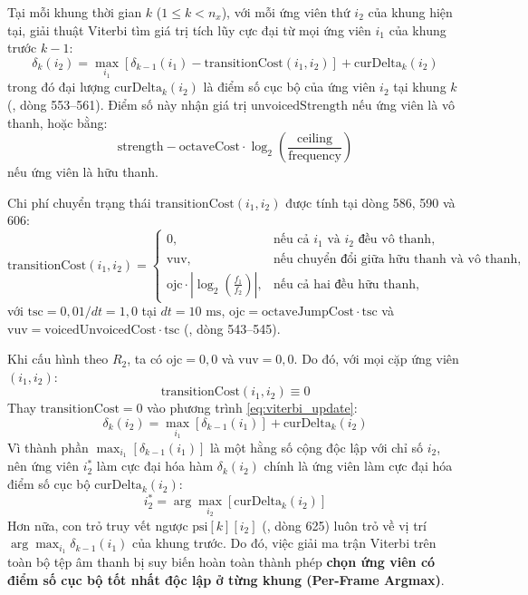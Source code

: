 Tại mỗi khung thời gian $k$ ($1 \le k < n_x$), với mỗi ứng viên thứ $i_2$ của khung hiện tại, giải thuật Viterbi tìm giá trị tích lũy cực đại từ mọi ứng viên $i_1$ của khung trước $k-1$:
\begin{equation}
    \delta_k(i_2) = \max_{i_1} \left[ \delta_{k-1}(i_1) - \text{transitionCost}(i_1, i_2) \right] + \text{curDelta}_k(i_2)
    \label{eq:viterbi_update}
\end{equation}
trong đó đại lượng $\text{curDelta}_k(i_2)$ là điểm số cục bộ của ứng viên $i_2$ tại khung $k$ (, dòng 553--561). Điểm số này nhận giá trị $\text{unvoicedStrength}$ nếu ứng viên là vô thanh, hoặc bằng:
\begin{equation}
    \text{strength} - \text{octaveCost} \cdot \log_2\left(\frac{\text{ceiling}}{\text{frequency}}\right)
\end{equation}
nếu ứng viên là hữu thanh.

Chi phí chuyển trạng thái $\text{transitionCost}(i_1, i_2)$ được tính tại dòng 586, 590 và 606:
\begin{equation}
    \text{transitionCost}(i_1, i_2) = 
    \begin{cases}
        0, & \text{nếu cả } i_1 \text{ và } i_2 \text{ đều vô thanh}, \\
        \text{vuv}, & \text{nếu chuyển đổi giữa hữu thanh và vô thanh}, \\
        \text{ojc} \cdot \left| \log_2\left(\frac{f_1}{f_2}\right) \right|, & \text{nếu cả hai đều hữu thanh},
    \end{cases}
\end{equation}
với $\text{tsc} = 0{,}01 / dt = 1{,}0$ tại $dt = 10\text{ ms}$, $\text{ojc} = \text{octaveJumpCost} \cdot \text{tsc}$ và $\text{vuv} = \text{voicedUnvoicedCost} \cdot \text{tsc}$ (, dòng 543--545).

Khi cấu hình theo $R_2$, ta có $\text{ojc} = 0{,}0$ và $\text{vuv} = 0{,}0$. Do đó, với mọi cặp ứng viên $(i_1, i_2)$:
\begin{equation}
    \text{transitionCost}(i_1, i_2) \equiv 0
\end{equation}
Thay $\text{transitionCost} = 0$ vào phương trình \eqref{eq:viterbi_update}:
\begin{equation}
    \delta_k(i_2) = \max_{i_1} \left[ \delta_{k-1}(i_1) \right] + \text{curDelta}_k(i_2)
\end{equation}
Vì thành phần $\max_{i_1} \left[ \delta_{k-1}(i_1) \right]$ là một hằng số cộng độc lập với chỉ số $i_2$, nên ứng viên $i_2^*$ làm cực đại hóa hàm $\delta_k(i_2)$ chính là ứng viên làm cực đại hóa điểm số cục bộ $\text{curDelta}_k(i_2)$:
\begin{equation}
    i_2^* = \arg\max_{i_2} \left[ \text{curDelta}_k(i_2) \right]
\end{equation}
Hơn nữa, con trỏ truy vết ngược $\text{psi}[k][i_2]$ (, dòng 625) luôn trỏ về vị trí $\arg\max_{i_1} \delta_{k-1}(i_1)$ của khung trước. Do đó, việc giải ma trận Viterbi trên toàn bộ tệp âm thanh bị suy biến hoàn toàn thành phép \textbf{chọn ứng viên có điểm số cục bộ tốt nhất độc lập ở từng khung (Per-Frame Argmax)}.

